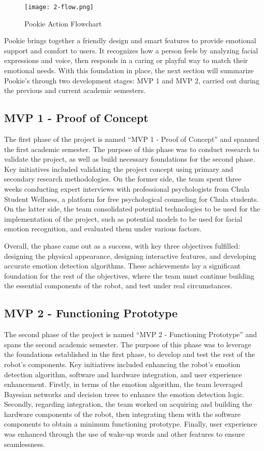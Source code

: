 \begin{figure}[ht]
    \centering
    \texttt{[image: 2-flow.png]}
    \captionsetup{justification=centering}
    \caption{Pookie Action Flowchart}
    \label{fig:2-flow}
\end{figure}

Pookie brings together a friendly design and smart features to provide emotional support and comfort to users. It recognizes how a person feels by analyzing facial expressions and voice, then responds in a caring or playful way to match their emotional needs. With this foundation in place, the next section will summarize Pookie’s through two development stages: MVP 1 and MVP 2, carried out during the previous and current academic semesters.

\subsection{MVP 1 - Proof of Concept}
The first phase of the project is named “MVP 1 - Proof of Concept” and spanned the first academic semester. The purpose of this phase was to conduct research to validate the project, as well as build necessary foundations for the second phase. Key initiatives included validating the project concept using primary and secondary research methodologies. On the former side, the team spent three weeks conducting expert interviews with professional psychologists from Chula Student Wellness, a platform for free psychological counseling for Chula students. On the latter side, the team consolidated potential technologies to be used for the implementation of the project, such as potential models to be used for facial emotion recognition, and evaluated them under various factors. 

Overall, the phase came out as a success, with key three objectives fulfilled: designing the physical appearance, designing interactive features, and developing accurate emotion detection algorithms. These achievements lay a significant foundation for the rest of the objectives, where the team must continue building the essential components of the robot, and test under real circumstances. 

\subsection{MVP 2 - Functioning Prototype}
The second phase of the project is named “MVP 2 - Functioning Prototype” and spans the second academic semester. The purpose of this phase was to leverage the foundations established in the first phase, to develop and test the rest of the robot’s components. Key initiatives included enhancing the robot’s emotion detection algorithm, software and hardware integration, and user experience enhancement. Firstly, in terms of the emotion algorithm, the team leveraged Bayesian networks and decision trees to enhance the emotion detection logic. Secondly, regarding integration, the team worked on acquiring and building the hardware components of the robot, then integrating them with the software components to obtain a minimum functioning prototype.  Finally, user experience was enhanced through the use of wake-up words and other features to ensure seamlessness. 

